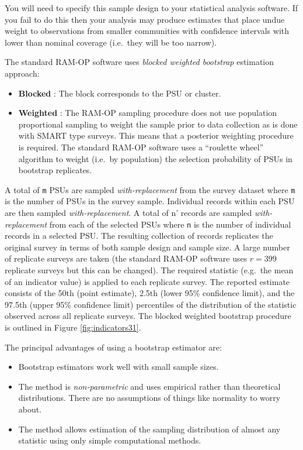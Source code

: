 \documentclass[12pt,a4paper]{book}
\providecommand{\tightlist}{%
  \setlength{\itemsep}{0pt}\setlength{\parskip}{0pt}}
\begin{document}
You will need to specify this sample design to your statistical analysis software. If you fail to do this then your analysis may produce estimates that place undue weight to observations from smaller communities with confidence intervals with lower than nominal coverage (i.e.~they will be too narrow).

The standard RAM-OP software uses \emph{blocked weighted bootstrap} estimation approach:

\begin{itemize}
\tightlist
\item
  \textbf{Blocked} : The block corresponds to the PSU or cluster.
\item
  \textbf{Weighted} : The RAM-OP sampling procedure does not use population proportional sampling to weight the sample prior to data collection as is done with SMART type surveys. This means that a posterior weighting procedure is required. The standard RAM-OP software uses a ``roulette wheel'' algorithm to weight (i.e.~by population) the selection probability of PSUs in bootstrap replicates.
\end{itemize}

A total of \texttt{m\textquotesingle{}} PSUs are sampled \emph{with-replacement} from the survey dataset where \texttt{m\textquotesingle{}} is the number of PSUs in the survey sample. Individual records within each PSU are then sampled \emph{with-replacement}. A total of n' records are sampled \emph{with-replacement} from each of the selected PSUs where \texttt{n\textquotesingle{}} is the number of individual records in a selected PSU. The resulting collection of records replicates the original survey in terms of both sample design and sample size. A large number of replicate surveys are taken (the standard RAM-OP software uses \(r = 399\) replicate surveys but this can be changed). The required statistic (e.g.~the mean of an indicator value) is applied to each replicate survey. The reported estimate consists of the 50th (point estimate), 2.5th (lower 95\% confidence limit), and the 97.5th (upper 95\% confidence limit) percentiles of the distribution of the statistic observed across all replicate surveys. The blocked weighted bootstrap procedure is outlined in Figure \ref{fig:indicators31}.

The principal advantages of using a bootstrap estimator are:

\begin{itemize}
\tightlist
\item
  Bootstrap estimators work well with small sample sizes.
\item
  The method is \emph{non-parametric} and uses empirical rather than theoretical distributions. There are no assumptions of things like normality to worry about.
\item
  The method allows estimation of the sampling distribution of almost any statistic using only simple computational methods.
\end{itemize}
\end{document}
